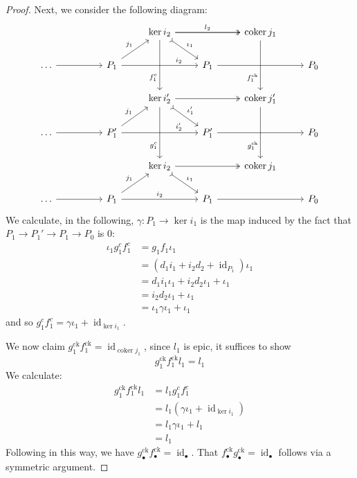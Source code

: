 \documentclass[12pt]{article}
\theoremstyle{plain}
\theoremstyle{definition}
\newcommand{\lto}{\longrightarrow}
\begin{document}
\begin{proof}
Next, we consider the following diagram:
\begin{equation}
\begin{tikzcd}
& & & \operatorname{ker}i_2\arrow[rr,twoheadrightarrow]\arrow[dr,rightarrowtail,"{\iota_1}"]\arrow[dd,swap,near end, "{f_1^c}"]\arrow[rr,"{l_2}"] & & \operatorname{coker}j_1\arrow[dd,swap,near end, "{f_1^{\text{ck}}}"]\\
\hdots\arrow[rr] & & P_1\arrow[ur,"{j_1}"]\arrow[rr,near end,"{i_2}"] & & P_1\arrow[rr] & & P_0\\
& & & \operatorname{ker}i_2'\arrow[rr,twoheadrightarrow]\arrow[dr,rightarrowtail,"{\iota_1'}"]\arrow[dd,swap,near end, "{g_1^c}"] & & \operatorname{coker}j_1'\arrow[dd,swap,near end, "{g_1^{\text{ck}}}"]\\
\hdots\arrow[rr] & & P_1'\arrow[ur,"{j_1}"]\arrow[rr,near end,"{i_2'}"] & & P_1'\arrow[rr]  & & P_0\\
& & & \operatorname{ker}i_2\arrow[rr,twoheadrightarrow]\arrow[dr,rightarrowtail,"{\iota_1}"] & & \operatorname{coker}j_1\\
\hdots\arrow[rr] & & P_1\arrow[ur,"{j_1}"]\arrow[rr,"{i_2}"] & & P_1\arrow[rr] & & P_0
\end{tikzcd}
\end{equation}
We calculate, in the following, $\gamma: P_1 \lto \operatorname{ker}i_1$ is the map induced by the fact that $P_1 \lto P_1' \lto P_1 \lto P_0$ is $0$:
\begin{align*}
\iota_1 g_1^cf_1^c &= g_1 f_1 \iota_1\\
&= (d_1 i_1 + i_2 d_2 + \operatorname{id}_{P_1})\iota_1\\
&= d_1 i_1 \iota_1 + i_2 d_2 \iota_1 + \iota_1\\
&= i_2 d_2 \iota_1 + \iota_1\\
&= \iota_1 \gamma \iota_1 + \iota_1
\end{align*}
and so $g_1^c f_1^c = \gamma \iota_1 + \operatorname{id}_{\operatorname{ker}i_1}$.

We now claim $g_1^{\text{ck}}f_1^{\text{ck}} = \operatorname{id}_{\operatorname{coker}j_1}$, since $l_1$ is epic, it suffices to show
\begin{equation}
g_1^{\text{ck}} f_1^{\text{ck}} l_1 = l_1
\end{equation}
We calculate:
\begin{align*}
g_1^{\text{ck}} f_1^{\text{ck}} l_1 &= l_1 g_1^cf_1^c\\
&= l_1(\gamma \iota_1 + \operatorname{id}_{\operatorname{ker}i_1})\\
&= l_1 \gamma \iota_1 + l_1\\
&= l_1
\end{align*}
Following in this way, we have $g_\bullet^{\text{ck}} f_\bullet^{\text{ck}} = \operatorname{id}_\bullet$. That $ f_\bullet^{\text{ck}}g_\bullet^{\text{ck}} = \operatorname{id}_\bullet$ follows via a symmetric argument.
\end{proof}
\end{document}
